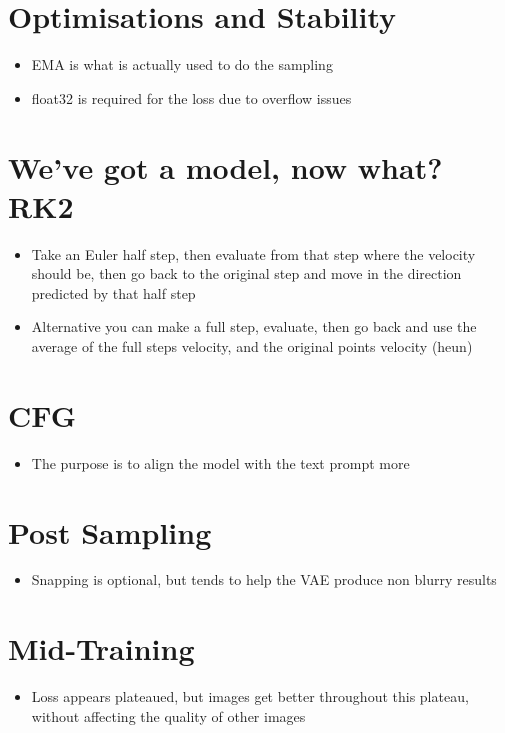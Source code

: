 \documentclass{article}
\begin{document}
\section*{Optimisations and Stability}

\begin{itemize}
    \item EMA is what is actually used to do the sampling
    \item float32 is required for the loss due to overflow issues
\end{itemize}

\section*{We've got a model, now what? RK2}

\begin{itemize}
    \item Take an Euler half step, then evaluate from that step where the velocity should be, then go back to the original step and move in the direction predicted by that half step
    \item Alternative you can make a full step, evaluate, then go back and use the average of the full steps velocity, and the original points velocity (heun)
\end{itemize}

\section*{CFG}

\begin{itemize}
    \item The purpose is to align the model with the text prompt more
\end{itemize}

\section*{Post Sampling}

\begin{itemize}
    \item Snapping is optional, but tends to help the VAE produce non blurry results
\end{itemize}

\section*{Mid-Training}

\begin{itemize}
    \item Loss appears plateaued, but images get better throughout this plateau, without affecting the quality of other images
\end{itemize}
\end{document}
